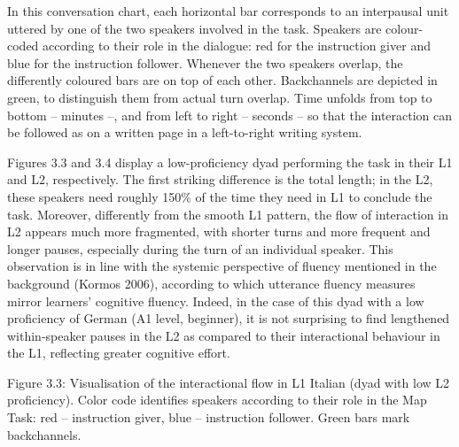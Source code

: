 \begin{styleStandard}
In this conversation chart, each horizontal bar corresponds to an interpausal unit uttered by one of the two speakers involved in the task. Speakers are colour-coded according to their role in the dialogue: red for the instruction giver and blue for the instruction follower. Whenever the two speakers overlap, the differently coloured bars are on top of each other. Backchannels are depicted in green, to distinguish them from actual turn overlap. Time unfolds from top to bottom – minutes –, and from left to right – seconds – so that the interaction can be followed as on a written page in a left-to-right writing system.
\end{styleStandard}

\begin{styleStandard}
Figures 3.3 and 3.4 display a low-proficiency dyad performing the task in their L1 and L2, respectively. The first striking difference is the total length; in the L2, these speakers need roughly 150\% of the time they need in L1 to conclude the task. Moreover, differently from the smooth L1 pattern, the flow of interaction in L2 appears much more fragmented, with shorter turns and more frequent and longer pauses, especially during the turn of an individual speaker. This observation is in line with the systemic perspective of fluency mentioned in the background (Kormos 2006), according to which utterance fluency measures mirror learners’ cognitive fluency. Indeed, in the case of this dyad with a low proficiency of German (A1 level, beginner), it is not surprising to find lengthened within-speaker pauses in the L2 as compared to their interactional behaviour in the L1, reflecting greater cognitive effort.
\end{styleStandard}

\begin{styleStandard}
  [Warning: Image ignored] %
 
\end{styleStandard}

\begin{stylecaption}
Figure 3.3: Visualisation of the interactional flow in L1 Italian (dyad with low L2 proficiency). Color code identifies speakers according to their role in the Map Task: red – instruction giver, blue – instruction follower. Green bars mark backchannels.
\end{stylecaption}

